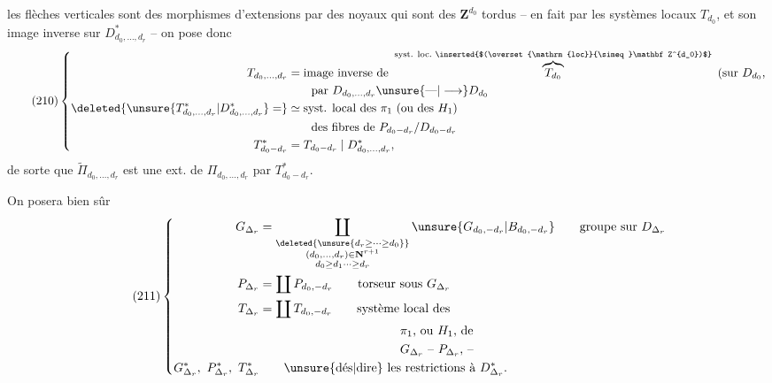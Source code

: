 les flèches verticales sont des morphismes
d'extensions par des noyaux qui sont des $\mathbf Z^{d_0}$
tordus -- en fait par les systèmes locaux
$T_{d_0}$, et son image inverse sur $D^*_{d_0,\ldots,d_r}$ --
on pose donc
\[
\tag{210}
\left\{\begin{aligned}
T_{d_0,\ldots,d_r}&=\text{image inverse de }\overbrace{T_{d_0}}^{\text{syst. loc.\ \inserted{$(\overset{\mathrm{loc}}{\simeq}\mathbf Z^{d_0})$}}}\text{ (sur }D_{d_0},\\
&\qquad\text{par }D_{d_0,\ldots,d_r}\unsure{\text{---}|\longrightarrow}D_{d_0}\\
\deleted{\unsure{T^*_{d_0,\ldots,d_r}|D^*_{d_0,\ldots,d_r}}=}
&\simeq\text{syst. local des }\pi_1\text{ (ou des }H_1\text{)}\\
&\qquad\text{des fibres de }P_{d_0- d_r}/D_{d_0- d_r}\\
T^*_{d_0- d_r}&=T_{d_0- d_r}\mid D^*_{d_0,\ldots,d_r},
\end{aligned}\right.
\]
de sorte que $\widetilde\Pi_{d_0,\ldots,d_r}$ est une ext. de
$\Pi_{d_0,\ldots,d_r}$ par $T^*_{d_0- d_r}$.

On posera bien sûr
\deleted{\[
\unsure{\widetilde\Pi_{*\Delta_r}|\Pi_{\Delta_r}}=\coprod\Pi_{d_0,\ldots,d_r}
\]}
\[
\tag{211}
\left\{\begin{aligned}
G_{\Delta_r}&=
\coprod_{\substack{\deleted{\unsure{d_r\geq\cdots\geq d_0}}\\(d_0,\ldots,d_r)\in\mathbf N^{r+1}\\d_0\geq d_1\cdots\geq d_r}}
\unsure{G_{d_0,-d_r}|B_{d_0,-d_r}}\qquad\text{groupe sur }D_{\Delta_r}\\
P_{\Delta_r}&=\coprod P_{d_0,-d_r}\qquad\text{torseur sous }G_{\Delta_r}\\
T_{\Delta_r}&=\coprod T_{d_0,-d_r}\qquad\text{système local des}\\
&\hspace{4cm}\pi_1\text{, ou }H_1\text{, de}\\
&\hspace{4cm}G_{\Delta_r}\text{ -- }P_{\Delta_r}\text{, --}\\
G^*_{\Delta_r},\ P^*_{\Delta_r},\ T^*_{\Delta_r}&\qquad\unsure{\text{dés}|\text{dire}}\ \text{les restrictions à }D^*_{\Delta_r}.
\end{aligned}\right.
\]

